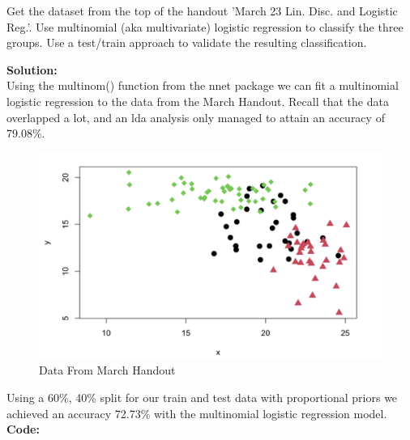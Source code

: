 \documentclass[12pt]{article}
\makeatletter
\theoremstyle{homework}
\newenvironment{exercise}[1]
{\def\@currentlabel{#1}\exercisecore}
{\endexercisecore}
\newcommand{\localhead}[1]{\par\smallskip\noindent\textbf{#1}\nobreak\\}%
\newcommand\solution{\localhead{Solution:}}
\makeatother
\begin{document}
\begin{exercise}{3} Get the dataset from the top of the handout 'March 23 Lin. Disc. and Logistic Reg.'. Use multinomial (aka multivariate) logistic regression to
  classify the three groups. Use a test/train approach to validate the resulting classification.\\
  \solution Using the multinom() function from the nnet package we can fit a multinomial logistic regression to the data from the March Handout. Recall that the data overlapped 
  a lot, and an lda analysis only managed to attain an accuracy of 79.08\%. 
  \begin{figure}[H]
    \begin{center}
      \caption{Data From March Handout}
    \includegraphics[width = \textwidth]{Rplot1.png}
    \end{center}
  \end{figure}
  Using a 60\%, 40\% split for our train and test data with proportional priors we achieved an accuracy 72.73\% with the multinomial logistic regression model.\\ 
  \textbf{Code:}
  \begin{center}
  
  \end{center}

  
\end{exercise}
\vspace{1in}
\end{document}
